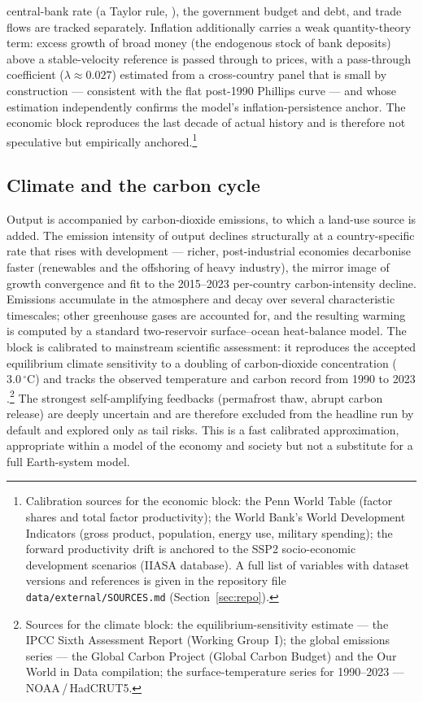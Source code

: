 \documentclass[11pt,a4paper]{article}
\begin{document}
central-bank rate (a Taylor rule, \citep{taylor1993}), the government budget and debt, and trade
flows are tracked separately. Inflation additionally carries a weak quantity-theory term: excess
growth of broad money (the endogenous stock of bank deposits) above a stable-velocity reference is
passed through to prices, with a pass-through coefficient ($\lambda\approx0.027$) estimated from a
cross-country panel that is small by construction --- consistent with the flat post-1990 Phillips
curve --- and whose estimation independently confirms the model's inflation-persistence anchor. The
economic block reproduces the last decade of actual history and is
therefore not speculative but empirically anchored.\footnote{Calibration sources for the economic
block: the Penn World Table (factor shares and total factor productivity); the World Bank's World
Development Indicators (gross product, population, energy use, military spending); the forward
productivity drift is anchored to the SSP2 socio-economic development scenarios (IIASA database). A
full list of variables with dataset versions and references is given in the repository file
\texttt{data/external/SOURCES.md} (Section~\ref{sec:repo}).}

\subsection{Climate and the carbon cycle}

Output is accompanied by carbon-dioxide emissions, to which a land-use source is added. The emission
intensity of output declines structurally at a country-specific rate that rises with development ---
richer, post-industrial economies decarbonise faster (renewables and the offshoring of heavy
industry), the mirror image of growth convergence and fit to the 2015--2023 per-country
carbon-intensity decline. Emissions accumulate in the atmosphere and decay over several
characteristic timescales; other greenhouse gases are accounted for, and the resulting warming is
computed by a standard two-reservoir surface--ocean heat-balance model. The block is calibrated to mainstream scientific assessment: it
reproduces the accepted equilibrium climate sensitivity to a doubling of carbon-dioxide
concentration ($3.0\,^\circ$C) and tracks the observed temperature and carbon record from 1990 to
2023 \citep{ipcc_ar6_wg1,friedlingstein2023}.\footnote{Sources for the climate block: the
equilibrium-sensitivity estimate --- the IPCC Sixth Assessment Report (Working Group~I); the global
emissions series --- the Global Carbon Project (Global Carbon Budget) and the Our World in Data
compilation; the surface-temperature series for 1990--2023 --- NOAA\,/\,HadCRUT5.} The strongest
self-amplifying feedbacks (permafrost thaw, abrupt carbon release) are deeply uncertain and are
therefore excluded from the headline run by default and explored only as tail risks. This is a fast
calibrated approximation, appropriate within a model of the economy and society but not a substitute
for a full Earth-system model.
\end{document}
